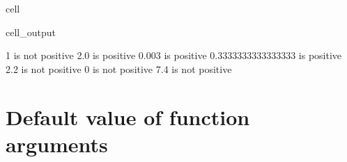 \documentclass[letterpaper,10pt,italian]{jupyterBook}
\begin{document}
\begin{sphinxuseclass}{cell}
\begin{sphinxVerbatimOutput}
\begin{sphinxuseclass}{cell_output}
\begin{sphinxVerbatim}[commandchars=\\\{\}]
\PYGZhy{}1 is not positive
2.0 is positive
0.003 is positive
0.3333333333333333 is positive
\PYGZhy{}2.2 is not positive
0 is not positive
\PYGZhy{}7.4 is not positive
\end{sphinxVerbatim}

\end{sphinxuseclass}\end{sphinxVerbatimOutput}

\end{sphinxuseclass}

\section{Default value of function arguments}
\label{\detokenize{ch/programming/functions:default-value-of-function-arguments}}
\end{document}
